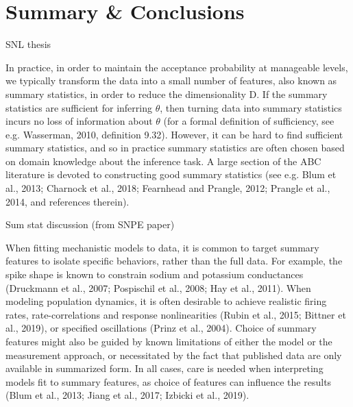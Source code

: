 \chapter{Summary \& Conclusions}\label{chap:Conclusion}

SNL thesis

In practice, in order to maintain the acceptance probability at manageable levels, we typically transform the data into a small number of features, also known as summary statistics, in order to reduce the dimensionality D. If the summary statistics are sufficient for inferring $\theta$, then turning data into summary statistics incurs no loss of information about $\theta$ (for a formal definition of sufficiency, see e.g. Wasserman, 2010, definition 9.32). However, it can be hard to find sufficient summary statistics, and so in practice summary statistics are often chosen based on domain knowledge about the inference task. A large section of the ABC literature is devoted to constructing good summary statistics (see e.g. Blum et al., 2013; Charnock et al., 2018; Fearnhead and Prangle, 2012; Prangle et al., 2014, and references therein).

Sum stat discussion (from SNPE paper)

When fitting mechanistic models to data, it is common to target summary features to isolate specific behaviors, rather than the full data. For example, the spike shape is known to constrain sodium and potassium conductances (Druckmann et al., 2007; Pospischil et al., 2008; Hay et al., 2011). When modeling population dynamics, it is often desirable to achieve realistic firing rates, rate-correlations and response nonlinearities (Rubin et al., 2015; Bittner et al., 2019), or specified oscillations (Prinz et al., 2004). Choice of summary features might also be guided by known limitations of either the model or the measurement approach, or necessitated by the fact that published data are only available in summarized form.  In all cases, care is needed when interpreting models fit to summary features, as choice of features can influence the results (Blum et al., 2013; Jiang et al., 2017; Izbicki et al., 2019).





